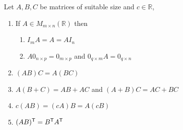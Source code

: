 \begin{theorem}
Let $A, B, C$ be matrices of suitable size and $c \in \mathbb{R}$,

\begin{enumerate}
    \item If $A \in M_{m \times n}(\mathbb{R})$ then
    \begin{enumerate}
        \item $I_mA = A = AI_n$
        \item $A0_{n \times p} =0_{m \times p}$ and $0_{q \times m}A = 0_{q \times n}$
    \end{enumerate}
    \item $(AB)C = A(BC)$
    \item $A(B + C) = AB + AC$ and $(A + B)C = AC + BC$
    \item $c(AB) = (cA)B = A(cB)$
    \item $(AB)^{\mathsf{T}} = B^{\mathsf{T}} A^{\mathsf{T}}$
\end{enumerate}
\end{theorem}

